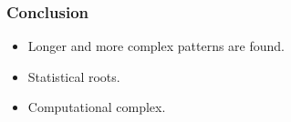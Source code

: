 \documentclass[smaller]{beamer}
\begin{document}
\begin{frame}
  \frametitle{ Conclusion }
\begin{itemize}
  \item Longer and more complex patterns are found.
  \item Statistical roots.
  \item Computational complex.
\end{itemize} 
\end{frame}
\end{document}
